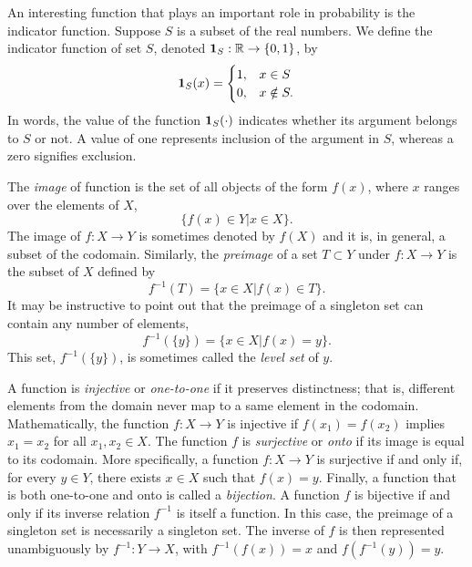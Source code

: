 \begin{example}
An interesting function that plays an important role in probability is the indicator function.
Suppose $S$ is a subset of the real numbers.
We define the indicator function of set $S$, denoted $\mathbf{1}_S: \mathbb{R} \rightarrow \{ 0, 1 \}$, by
\begin{equation*}
\mathbf{1}_S (x) = \begin{cases} 1, & x \in S\\
0, & x \notin S . \end{cases}
\end{equation*}
In words, the value of the function $\mathbf{1}_S (\cdot)$ indicates whether its argument belongs to $S$ or not.
A value of one represents inclusion of the argument in $S$, whereas a zero signifies exclusion.
\end{example}

The \emph{image} of function is the set of all objects of the form $f(x)$, where $x$ ranges over the elements of $X$,
\begin{equation*}
\{ f(x) \in Y | x \in X \} .
\end{equation*}
The image of $f: X \rightarrow Y$ is sometimes denoted by $f(X)$ and it is, in general, a subset of the codomain.
Similarly, the \emph{preimage} of a set $T \subset Y$ under $f: X \rightarrow Y$ is the subset of $X$ defined by
\begin{equation*}
f^{-1} (T) = \{ x \in X | f(x) \in T \} .
\end{equation*}
It may be instructive to point out that the preimage of a singleton set can contain any number of elements,
\begin{equation*}
f^{-1} (\{ y \}) = \{ x \in X | f(x) = y \} .
\end{equation*}
This set, $f^{-1} (\{ y \})$, is sometimes called the \emph{level set} of $y$.

A function is \emph{injective} or \emph{one-to-one} if it preserves distinctness;
that is, different elements from the domain never map to a same element in the codomain.
Mathematically, the function $f: X \rightarrow Y$ is injective if $f(x_1) = f(x_2)$ implies $x_1 = x_2$ for all $x_1, x_2 \in X$.
The function $f$ is \emph{surjective} or \emph{onto} if its image is equal to its codomain.
More specifically, a function $f: X \rightarrow Y$ is surjective if and only if, for every $y \in Y$, there exists $x \in X$ such that $f(x) = y$.
Finally, a function that is both one-to-one and onto is called a \emph{bijection}.
A function $f$ is bijective if and only if its inverse relation $f^{-1}$ is itself a function.
In this case, the preimage of a singleton set is necessarily a singleton set.
The inverse of $f$ is then represented unambiguously by $f^{-1}: Y \rightarrow X$,
with $f^{-1} (f(x)) = x$ and $f (f^{-1} (y)) = y$.


